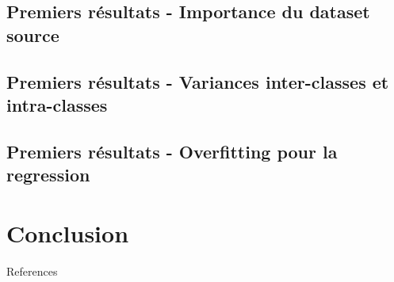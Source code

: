 \documentclass[xcolor=table, 8pt]{beamer}
\begin{document}
    \subsection{Premiers résultats - Importance du dataset source}\label{subsec:results-srcdata}
    


    \subsection{Premiers résultats - Variances inter-classes et intra-classes}\label{subsec:results-variances}
    
    

    \subsection{Premiers résultats - Overfitting pour la regression}\label{subsec:results-loracurves}
    


    \section{Conclusion}
    


    \begin{frame}[allowframebreaks=]{References}
        \printbibliography
    \end{frame}
\end{document}

